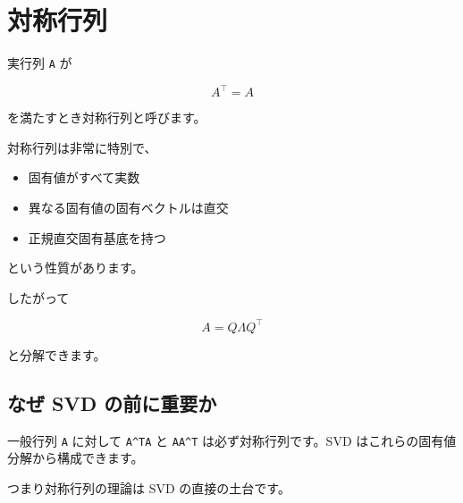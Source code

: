 \documentclass[
  11pt,
  a4paper,
]{ltjsarticle}
\author{}
\date{}
\providecommand{\tightlist}{%
  \setlength{\itemsep}{0pt}\setlength{\parskip}{0pt}}
\begin{document}
\hypertarget{ux5bfeux79f0ux884cux5217}{%
\section{対称行列}\label{ux5bfeux79f0ux884cux5217}}

実行列 \texttt{A} が

\[
A^\top=A
\]

を満たすとき対称行列と呼びます。

対称行列は非常に特別で、

\begin{itemize}
\tightlist
\item
  固有値がすべて実数
\item
  異なる固有値の固有ベクトルは直交
\item
  正規直交固有基底を持つ
\end{itemize}

という性質があります。

したがって

\[
A=Q\Lambda Q^\top
\]

と分解できます。

\hypertarget{ux306aux305c-svd-ux306eux524dux306bux91cdux8981ux304b}{%
\subsection{なぜ SVD
の前に重要か}\label{ux306aux305c-svd-ux306eux524dux306bux91cdux8981ux304b}}

一般行列 \texttt{A} に対して \texttt{A\^{}TA} と \texttt{AA\^{}T}
は必ず対称行列です。SVD はこれらの固有値分解から構成できます。

つまり対称行列の理論は SVD の直接の土台です。
\end{document}

